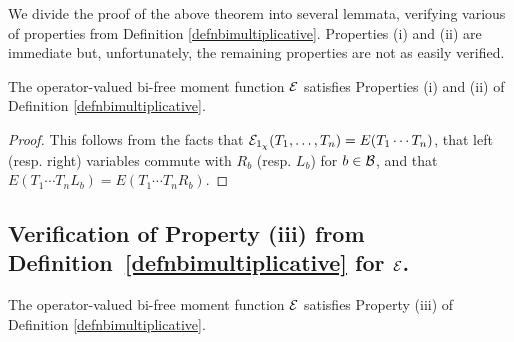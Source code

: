We divide the proof of the above theorem into several lemmata, verifying various of properties from Definition \ref{defnbimultiplicative}.
Properties (i) and (ii) are immediate but, unfortunately, the remaining properties are not as easily verified.




\begin{lemma}
	\label{lemeasy}
	The operator-valued bi-free moment function $\mathcal{E}$ satisfies Properties (i) and (ii) of Definition \ref{defnbimultiplicative}.
\end{lemma}

\begin{proof}
	This follows from the facts that $\mathcal{E}_{1_\chi}(T_1, \ldots, T_n) = E(T_1\cdots T_n)$, that left (resp. right) variables commute with $R_b$ (resp. $L_b$) for $b \in \mathcal{B}$, and that $E(T_1\cdots T_nL_b) = E(T_1\cdots T_nR_b)$.
\end{proof}




\subsection{Verification of Property (iii) from Definition~\ref{defnbimultiplicative} for $\mathcal{E}$.}

\begin{lemma}
	\label{lemproductofdisjointblocksforE}
	The operator-valued bi-free moment function $\mathcal{E}$ satisfies Property (iii) of Definition \ref{defnbimultiplicative}.
\end{lemma}

